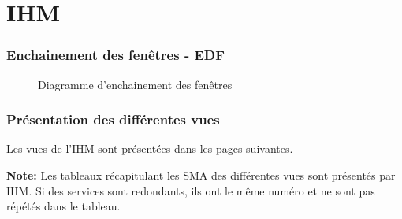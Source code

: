 \part{IHM}
\setcounter{section}{0}

\section{Enchainement des fenêtres - EDF}

\begin{figure}[H]
\noindent{}
\caption{Diagramme d'enchainement des fenêtres}
\end{figure}

\section{Présentation des différentes vues}
Les vues de l'IHM sont présentées dans les pages suivantes.

\begin{shaded}
\textbf{Note: } Les tableaux récapitulant les SMA des différentes vues sont présentés par IHM. Si des services sont redondants, ils ont le même numéro et ne sont pas répétés dans le tableau. 
\end{shaded}




